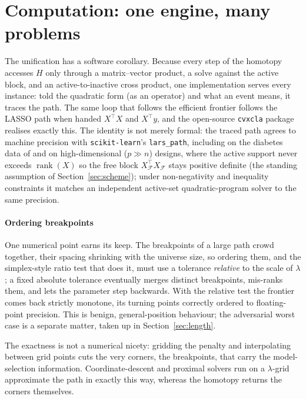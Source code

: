 \documentclass[sts]{imsart}
\newcommand{\F}{\mathcal{F}}
\newcommand{\trans}{^{\top}}
\theoremstyle{plain}
\theoremstyle{definition}
\begin{document}
\section{Computation: one engine, many problems}
\label{sec:comp}

The unification has a software corollary. Because every step of the homotopy accesses
$H$ only through a matrix--vector product, a solve against the active block, and an
active-to-inactive cross product, one implementation serves every instance: told the
quadratic form (as an operator) and what an event means, it traces the path. The same
loop that follows the efficient frontier follows the LASSO path when handed
$X\trans X$ and $X\trans y$, and the open-source \texttt{cvxcla} package \citep{cvxcla}
realises exactly this. The identity is not merely formal: the traced path agrees to
machine precision with \texttt{scikit-learn}'s \texttt{lars\_path}, including on the
diabetes data of \citet{efron2004} and on high-dimensional ($p\gg n$) designs, where the
active support never exceeds $\operatorname{rank}(X)$ so the free block
$X_\F\trans X_\F$ stays positive definite (the standing assumption of
Section~\ref{sec:scheme}); under non-negativity and inequality constraints it matches an
independent active-set quadratic-program solver to the same precision.

\paragraph{Ordering breakpoints} One numerical point earns its keep. The breakpoints of a
large path crowd together, their spacing shrinking with the universe size, so ordering
them, and the simplex-style ratio test that does it, must use a tolerance \emph{relative}
to the scale of $\lambda$; a fixed absolute tolerance eventually merges distinct
breakpoints, mis-ranks them, and lets the parameter step backwards. With the relative
test the frontier comes back strictly monotone, its turning points correctly ordered to
floating-point precision. This is benign, general-position behaviour; the adversarial
worst case is a separate matter, taken up in Section~\ref{sec:length}.

The exactness is not a numerical nicety: gridding the penalty and interpolating between
grid points cuts the very corners, the breakpoints, that carry the model-selection
information. Coordinate-descent and proximal solvers run on a $\lambda$-grid approximate
the path in exactly this way, whereas the homotopy returns the corners themselves.
\end{document}
